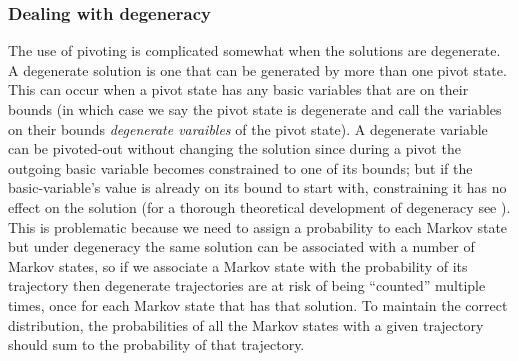 \documentclass{article}
\begin{document}


\subsubsection{Dealing with degeneracy}

The use of pivoting is complicated somewhat when the solutions are degenerate. A degenerate solution is one that can be generated by more than one pivot state. This can occur when a pivot state has any basic variables that are on their bounds (in which case we say the pivot state is degenerate and call the variables on their bounds \textit{degenerate varaibles} of the pivot state). A degenerate variable can be pivoted-out without changing the solution since during a pivot the outgoing basic variable becomes constrained to one of its bounds; but if the basic-variable's value is already on its bound to start with, constraining it has no effect on the solution (for a thorough theoretical development of degeneracy see \cite{zornig93degeneracy}). This is problematic because we need to assign a probability to each Markov state but under degeneracy the same solution can be associated with a number of Markov states, so if we associate a Markov state with the probability of its trajectory then degenerate trajectories are at risk of being ``counted'' multiple times, once for each Markov state that has that solution. To maintain the correct distribution, the probabilities of all the Markov states with a given trajectory should sum to the probability of that trajectory.
\end{document}
